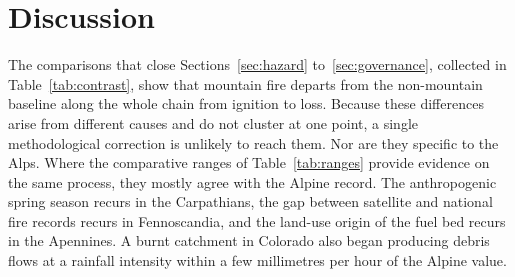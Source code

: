 \documentclass[11pt,a4paper]{article}
\begin{document}
\section{Discussion}
\label{sec:discussion}

The comparisons that close Sections~\ref{sec:hazard} to~\ref{sec:governance}, collected in Table~\ref{tab:contrast}, show that mountain fire departs from the non-mountain baseline along the whole chain from ignition to loss. Because these differences arise from different causes and do not cluster at one point, a single methodological correction is unlikely to reach them. Nor are they specific to the Alps. Where the comparative ranges of Table~\ref{tab:ranges} provide evidence on the same process, they mostly agree with the Alpine record. The anthropogenic spring season recurs in the Carpathians, the gap between satellite and national fire records recurs in Fennoscandia, and the land-use origin of the fuel bed recurs in the Apennines. A burnt catchment in Colorado also began producing debris flows at a rainfall intensity within a few millimetres per hour of the Alpine value.
\end{document}
